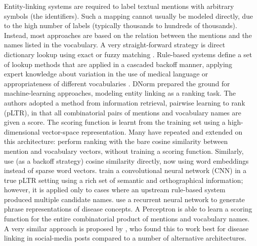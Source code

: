 \documentclass{bioinfo}
\newcommand{\eg}{e.\,g.\ }
\begin{document}
Entity-linking systems are required to label textual mentions with arbitrary symbols (the identifiers).
Such a mapping cannot usually be modeled directly, due to the high number of labels (typically thousands to hundreds of thousands).
Instead, most approaches are based on the relation between the mentions and the names listed in the vocabulary.
A very straight-forward strategy is direct dictionary lookup using exact \citep[\eg Neji,][]{campos-et-al:2013:neji} or fuzzy matching \citep[\eg][]{ghiasvand-kate:2014:SemEval,bravo-et-al:2014}.  %
Rule-based systems define a set of lookup methods that are applied in a cascaded backoff manner, applying expert knowledge about variation in the use of medical language \citep{dsouza-ng:2015:ACL-IJCNLP} or appropriateness of different vocabularies \citep{lee-et-al:2016}.  %
DNorm \citep{leaman-et-al:2013} prepared the ground for machine-learning approaches, modeling entity linking as a ranking task.
The authors adopted a method from information retrieval, pairwise learning to rank (pLTR), in that all combinatorial pairs of mentions and vocabulary names are given a score.
The scoring function is learnt from the training set using a high-dimensional vector-space representation.
Many have repeated and extended on this architecture:
\cite{zhang-et-al:2014:SemEval} perform ranking with the bare cosine similarity between mention and vocabulary vectors, without training a scoring function.
Similarly, \cite{cho-et-al:2017} use (as a backoff strategy) cosine similarity directly, now using word embeddings instead of sparse word vectors.
\cite{lihaodi-et-al:2017} train a convolutional neural network (CNN) in a true pLTR setting using a rich set of semantic and orthographical information; however, it is applied only to cases where an upstream rule-based system produced multiple candidate names.
\cite{liu-xu:2018:NLPCC} use a recurrent neural network to generate phrase representations of disease concepts.
A Perceptron is able to learn a scoring function for the entire combinatorial product of mentions and vocabulary names.
A very similar approach is proposed by \cite{tutubalina-et-al:2018}, who found this to work best for disease linking in social-media posts compared to a number of alternative architectures.
\end{document}
